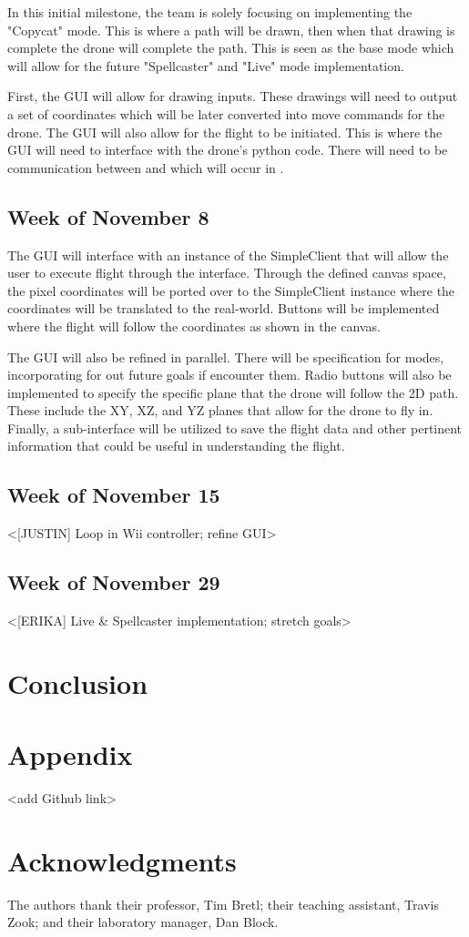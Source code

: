 \documentclass[conf]{new-aiaa}
\begin{document}
        In this initial milestone, the team is solely focusing on implementing the "Copycat" mode. This is where a path will be drawn, then when that drawing is complete the drone will complete the path. This is seen as the base mode which will allow for the future "Spellcaster" and "Live" mode implementation.
        
        First, the GUI will allow for drawing inputs. These drawings will need to output a set of coordinates which will be later converted into move commands for the drone. The GUI will also allow for the flight to be initiated. This is where the GUI will need to interface with the drone's python code. There will need to be communication between  and  which will occur in . 
        
         
    \subsection{Week of November 8}
        
        The GUI will interface with an instance of the SimpleClient that will allow the user to execute flight through the interface. Through the defined canvas space, the pixel coordinates will be ported over to the SimpleClient instance where the coordinates will be translated to the real-world. Buttons will be implemented where the flight will follow the coordinates as shown in the canvas. 
        
        The GUI will also be refined in parallel. There will be specification for modes, incorporating for out future goals if encounter them. Radio buttons will also be implemented to specify the specific plane that the drone will follow the 2D path. These include the XY, XZ, and YZ planes that allow for the drone to fly in. Finally, a sub-interface will be utilized to save the flight data and other pertinent information that could be useful in understanding the flight. 
        
    \subsection{Week of November 15}
    <[JUSTIN] Loop in Wii controller; refine GUI>
    \subsection{Week of November 29}
    <[ERIKA] Live & Spellcaster implementation; stretch goals>
\section{Conclusion}

\section*{Appendix}
<add Github link>
    

\section*{Acknowledgments}

    The authors thank their professor, Tim Bretl; their teaching assistant, Travis Zook; and their laboratory manager, Dan Block.
    

\end{document}
